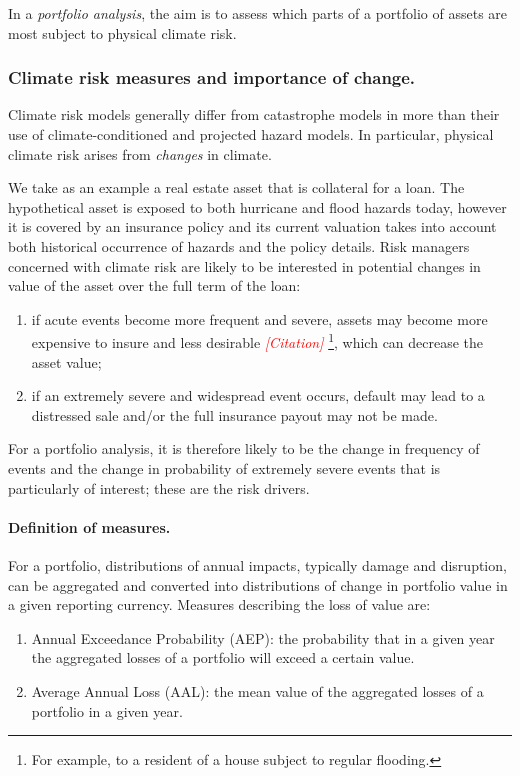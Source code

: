 \documentclass[a4paper,11pt]{extarticle} %
\theoremstyle{definition}
\begin{document}
In a \emph{portfolio analysis}, the aim is to assess which parts of a portfolio of assets are most subject to physical climate risk.

\subsubsection{Climate risk measures and importance of change.}
Climate risk models generally differ from catastrophe models in more than their use of climate-conditioned and projected hazard models. In particular, physical climate risk arises from \emph{changes} in climate.

We take as an example a real estate asset that is collateral for a loan. The hypothetical asset is exposed to both hurricane and flood hazards today, however it is covered by an insurance policy and its current valuation takes into account both historical occurrence of hazards and the policy details. Risk managers concerned with climate risk are likely to be interested in potential changes in value of the asset over the full term of the loan:

\begin{enumerate}
    \item if acute events become more frequent and severe, assets may become more expensive to insure and less desirable {\textcolor{red}{\emph{[Citation]}}} \footnote{For example, to a resident of a house subject to regular flooding.}, which can decrease the asset value;
    \item if an extremely severe and widespread event occurs, default may lead to a distressed sale and/or the full insurance payout may not be made.
\end{enumerate}

For a portfolio analysis, it is therefore likely to be the change in frequency of events and the change in probability of extremely severe events that is particularly of interest; these are the risk drivers.

\paragraph{Definition of measures.} For a portfolio, distributions of annual impacts, typically damage and disruption, can be aggregated and converted into distributions of change in portfolio value in a given reporting currency. Measures describing the loss of value are:

\begin{enumerate}
    \item Annual Exceedance Probability (AEP): the probability that in a given year the aggregated losses of a portfolio will exceed a certain value.
    \item Average Annual Loss (AAL): the mean value of the aggregated losses of a portfolio in a given year.
\end{enumerate}
\end{document}
